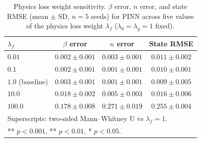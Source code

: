 \begin{table}[htbp]
\centering
\caption{Physics loss weight sensitivity. $\beta$ error, $n$ error, and state RMSE (mean $\pm$ SD, $n = 5$ seeds) for PINN across five values of the physics loss weight $\lambda_f$ ($\lambda_0 = \lambda_y = 1$ fixed).}
\label{tab:exp6_loss_weights}
{\small\setlength{\tabcolsep}{5pt}%
\begin{tabular*}{\textwidth}{@{\extracolsep{\fill}}lccc}
\toprule
$\lambda_f$ & $\beta$ error & $n$ error & State RMSE \\
\midrule
$0.01$ & $0.002 \pm 0.001$ & $0.003 \pm 0.001$ & $0.011 \pm 0.002$ \\
$0.1$ & $0.002 \pm 0.001$ & $0.001 \pm 0.001$ & $0.010 \pm 0.001$ \\
$1.0$ (baseline) & $0.003 \pm 0.001$ & $0.001 \pm 0.001$ & $0.009 \pm 0.005$ \\
$10.0$ & $0.018 \pm 0.002$\rlap{\textsuperscript{**}} & $0.005 \pm 0.003$ & $0.016 \pm 0.006$ \\
$100.0$ & $0.178 \pm 0.008$\rlap{\textsuperscript{**}} & $0.271 \pm 0.019$\rlap{\textsuperscript{**}} & $0.255 \pm 0.004$\rlap{\textsuperscript{**}} \\
\bottomrule
\multicolumn{4}{l}{\footnotesize Superscripts: two-sided Mann--Whitney U vs $\lambda_f = 1$.} \\
\multicolumn{4}{l}{\footnotesize *** $p < 0.001$, ** $p < 0.01$, * $p < 0.05$.} \\
\end{tabular*}}
\end{table}
